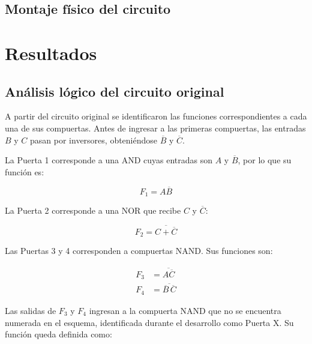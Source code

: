\documentclass[12pt]{report}
\begin{document}


\subsection{Montaje físico del circuito}



\section{Resultados}


\subsection{Análisis lógico del circuito original}

A partir del circuito original se identificaron las funciones correspondientes a
cada una de sus compuertas. Antes de ingresar a las primeras compuertas, las
entradas $B$ y $C$ pasan por inversores, obteniéndose $\overline{B}$ y
$\overline{C}$.

La Puerta 1 corresponde a una AND cuyas entradas son $A$ y $\overline{B}$, por lo
que su función es:

\begin{equation}
    F_1 = A\overline{B}
\end{equation}

La Puerta 2 corresponde a una NOR que recibe $C$ y $\overline{C}$:

\begin{equation}
    F_2 = \overline{C+\overline{C}}
\end{equation}

Las Puertas 3 y 4 corresponden a compuertas NAND. Sus funciones son:

\begin{align}
    F_3 &= \overline{A\overline{C}} \\
    F_4 &= \overline{\overline{B}\,\overline{C}}
\end{align}

Las salidas de $F_3$ y $F_4$ ingresan a la compuerta NAND que no se encuentra
numerada en el esquema, identificada durante el desarrollo como Puerta X. Su función
queda definida como:
\end{document}

